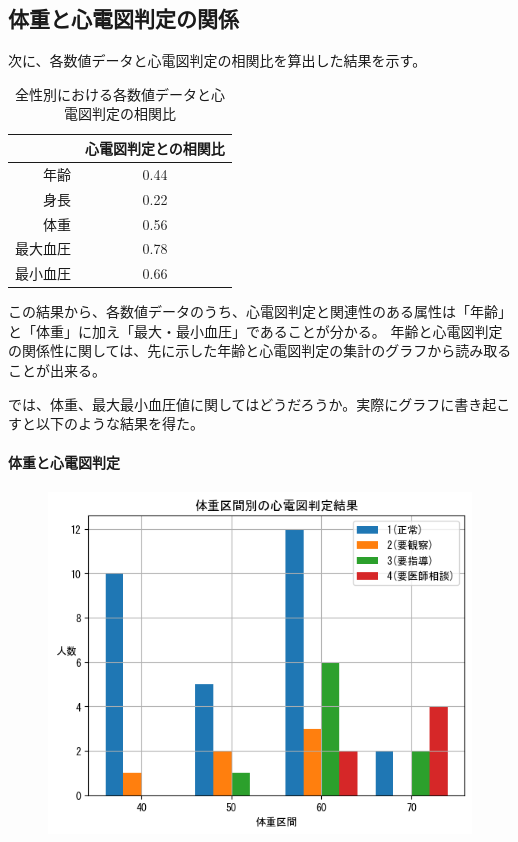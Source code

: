 \documentclass[dvipdfmx]{jsarticle}
\begin{document}
    \subsection{体重と心電図判定の関係}
    次に、各数値データと心電図判定の相関比を算出した結果を示す。
    \begin{table}[H]
        \centering
        \begin{tabular}{r|c}
            & 心電図判定との相関比 \\ \hline
        年齢   & 0.44       \\
        身長   & 0.22       \\
        体重   & 0.56       \\
        最大血圧 & 0.78       \\
        最小血圧 & 0.66      
        \end{tabular}
        \caption{全性別における各数値データと心電図判定の相関比}
    \end{table}
    この結果から、各数値データのうち、心電図判定と関連性のある属性は「年齢」と「体重」に加え「最大・最小血圧」であることが分かる。
    年齢と心電図判定の関係性に関しては、先に示した年齢と心電図判定の集計のグラフから読み取ることが出来る。\par
    では、体重、最大最小血圧値に関してはどうだろうか。実際にグラフに書き起こすと以下のような結果を得た。\par
    \paragraph{体重と心電図判定}
    \begin{figure}[H]
        \centering
        \includegraphics[scale=0.7]{images/allgender/weight_heart_result.png}
    \end{figure}
    
\end{document}
